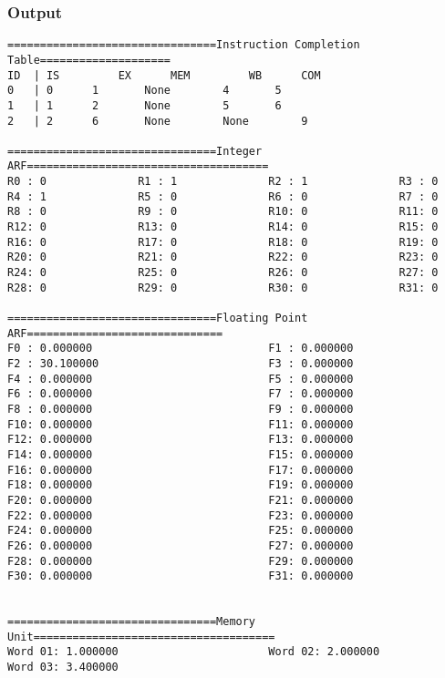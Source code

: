 \documentclass[12pt]{article}
\begin{document}
\subsubsection*{Output}
\begin{verbatim}
================================Instruction Completion Table====================
ID	| IS		 EX		 MEM		 WB		 COM
0	| 0		 1		 None		 4		 5
1	| 1		 2		 None		 5		 6
2	| 2		 6		 None		 None		 9

================================Integer ARF=====================================
R0 : 0              R1 : 1              R2 : 1              R3 : 0              
R4 : 1              R5 : 0              R6 : 0              R7 : 0              
R8 : 0              R9 : 0              R10: 0              R11: 0              
R12: 0              R13: 0              R14: 0              R15: 0              
R16: 0              R17: 0              R18: 0              R19: 0              
R20: 0              R21: 0              R22: 0              R23: 0              
R24: 0              R25: 0              R26: 0              R27: 0              
R28: 0              R29: 0              R30: 0              R31: 0              

================================Floating Point ARF==============================
F0 : 0.000000                           F1 : 0.000000                           
F2 : 30.100000                          F3 : 0.000000                           
F4 : 0.000000                           F5 : 0.000000                           
F6 : 0.000000                           F7 : 0.000000                           
F8 : 0.000000                           F9 : 0.000000                           
F10: 0.000000                           F11: 0.000000                           
F12: 0.000000                           F13: 0.000000                           
F14: 0.000000                           F15: 0.000000                           
F16: 0.000000                           F17: 0.000000                           
F18: 0.000000                           F19: 0.000000                           
F20: 0.000000                           F21: 0.000000                           
F22: 0.000000                           F23: 0.000000                           
F24: 0.000000                           F25: 0.000000                           
F26: 0.000000                           F27: 0.000000                           
F28: 0.000000                           F29: 0.000000                           
F30: 0.000000                           F31: 0.000000                           


================================Memory Unit=====================================
Word 01: 1.000000                       Word 02: 2.000000                       
Word 03: 3.400000 
\end{verbatim}
\end{document}
